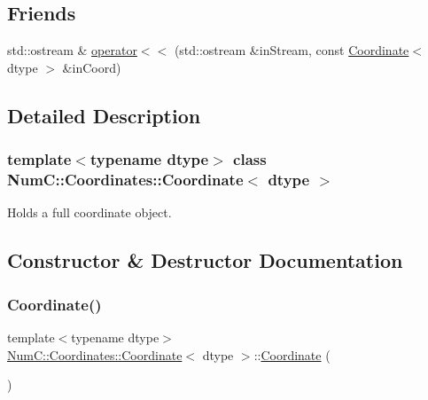 \subsection*{Friends}
\begin{DoxyCompactItemize}
\item 
std\+::ostream \& \mbox{\hyperlink{class_num_c_1_1_coordinates_1_1_coordinate_aa5a56295ef46edb54bf7fdafb169c081}{operator$<$$<$}} (std\+::ostream \&in\+Stream, const \mbox{\hyperlink{class_num_c_1_1_coordinates_1_1_coordinate}{Coordinate}}$<$ dtype $>$ \&in\+Coord)
\end{DoxyCompactItemize}


\subsection{Detailed Description}
\subsubsection*{template$<$typename dtype$>$\newline
class Num\+C\+::\+Coordinates\+::\+Coordinate$<$ dtype $>$}

Holds a full coordinate object. 

\subsection{Constructor \& Destructor Documentation}
\mbox{\label{class_num_c_1_1_coordinates_1_1_coordinate_ae32aea9949fa7f836660caeded649176}} 
\subsubsection{\texorpdfstring{Coordinate()}{Coordinate()}\hspace{0.1cm}{\footnotesize\ttfamily [1/6]}}
{\footnotesize\ttfamily template$<$typename dtype$>$ \\
\mbox{\hyperlink{class_num_c_1_1_coordinates_1_1_coordinate}{Num\+C\+::\+Coordinates\+::\+Coordinate}}$<$ dtype $>$\+::\mbox{\hyperlink{class_num_c_1_1_coordinates_1_1_coordinate}{Coordinate}} (\begin{DoxyParamCaption}{ }\end{DoxyParamCaption})\hspace{0.3cm}{\ttfamily [inline]}}

